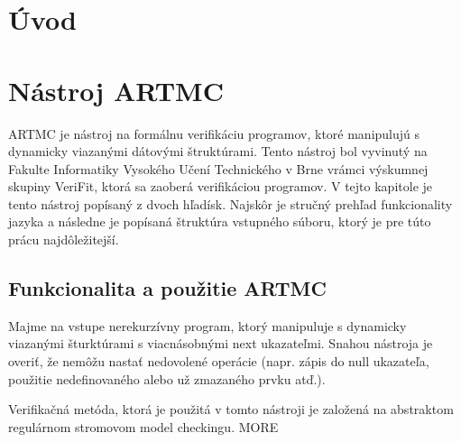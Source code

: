 
\chapter{Úvod}

\chapter{Nástroj ARTMC}
ARTMC je nástroj na formálnu verifikáciu programov, ktoré manipulujú s
 dynamicky viazanými dátovými štruktúrami. Tento nástroj bol vyvinutý na Fakulte
 Informatiky Vysokého Učení Technického v Brne vrámci výskumnej skupiny VeriFit,
 ktorá sa zaoberá verifikáciou programov. V tejto kapitole je tento nástroj
 popísaný z dvoch hľadísk. Najskôr je stručný prehľad funkcionality jazyka a
 následne je popísaná štruktúra vstupného súboru, ktorý je pre túto prácu
 najdôležitejší.

 \section{Funkcionalita a použitie ARTMC}
 Majme na vstupe nerekurzívny program, ktorý manipuluje s dynamicky viazanými
 šturktúrami s viacnásobnými next ukazateľmi. Snahou nástroja je overiť, že
 nemôžu nastať nedovolené operácie (napr. zápis do null ukazateľa, použitie
 nedefinovaného alebo už zmazaného prvku atď.).

 Verifikačná metóda, ktorá je použitá v tomto nástroji je založená na abstraktom
 regulárnom stromovom model checkingu. MORE 

